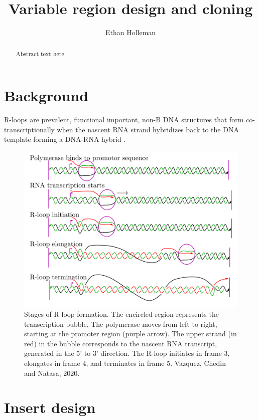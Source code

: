\documentclass[11pt]{article}
\author{Ethan Holleman}
\title{Variable region design and cloning}
\begin{document}
\maketitle
\begin{abstract}
	Abstract text here
\end{abstract}

\tableofcontents
\pagebreak

\section{Background}

R-loops are prevalent, functional important, non-B DNA structures that form co-transcriptionally when the nascent RNA strand hybridizes back to the DNA template forming a DNA-RNA hybrid \cite{chedin_nascent_2016}. 

\begin{figure}[H]
	\includegraphics[width=12cm]{images/r-loops/rloop_stages.png}
	\centering
	\caption{Stages of R-loop formation. The encircled region represents the transcription bubble. The polymerase moves from left to right, starting at the promoter region (purple arrow). The upper strand (in red) in the bubble corresponds to the nascent RNA transcript, generated in the 5' to 3' direction. The R-loop initiates in frame 3, elongates in frame 4, and terminates in frame 5. Vazquez, Chedin and Natasa, 2020.}
	\label{fig:1}
\end{figure}




\section{Insert design}
\end{document}
